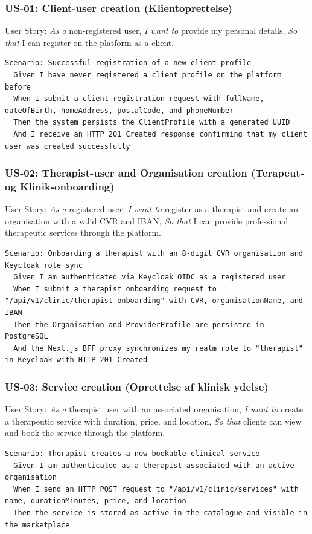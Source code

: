 \documentclass[11pt,a4paper]{article}
\begin{document}
\subsubsection{US-01: Client-user creation (Klientoprettelse)}
User Story: \textit{As a} non-registered user, \textit{I want to} provide my personal details, \textit{So that} I can register on the platform as a client.
\begin{lstlisting}[language={}]
Scenario: Successful registration of a new client profile
  Given I have never registered a client profile on the platform before
  When I submit a client registration request with fullName, dateOfBirth, homeAddress, postalCode, and phoneNumber
  Then the system persists the ClientProfile with a generated UUID
  And I receive an HTTP 201 Created response confirming that my client user was created successfully
\end{lstlisting}

\subsubsection{US-02: Therapist-user and Organisation creation (Terapeut- og Klinik-onboarding)}
User Story: \textit{As a} registered user, \textit{I want to} register as a therapist and create an organisation with a valid CVR and IBAN, \textit{So that} I can provide professional therapeutic services through the platform.
\begin{lstlisting}[language={}]
Scenario: Onboarding a therapist with an 8-digit CVR organisation and Keycloak role sync
  Given I am authenticated via Keycloak OIDC as a registered user
  When I submit a therapist onboarding request to "/api/v1/clinic/therapist-onboarding" with CVR, organisationName, and IBAN
  Then the Organisation and ProviderProfile are persisted in PostgreSQL
  And the Next.js BFF proxy synchronizes my realm role to "therapist" in Keycloak with HTTP 201 Created
\end{lstlisting}

\subsubsection{US-03: Service creation (Oprettelse af klinisk ydelse)}
User Story: \textit{As a} therapist user with an associated organisation, \textit{I want to} create a therapeutic service with duration, price, and location, \textit{So that} clients can view and book the service through the platform.
\begin{lstlisting}[language={}]
Scenario: Therapist creates a new bookable clinical service
  Given I am authenticated as a therapist associated with an active organisation
  When I send an HTTP POST request to "/api/v1/clinic/services" with name, durationMinutes, price, and location
  Then the service is stored as active in the catalogue and visible in the marketplace
\end{lstlisting}
\end{document}
